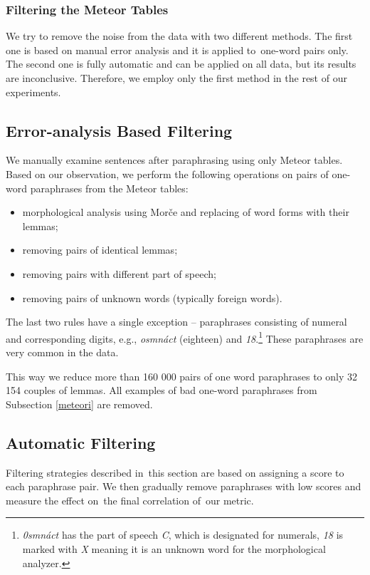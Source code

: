 \documentclass[11pt]{article}
\begin{document}
\subsubsection{Filtering the Meteor Tables}
\label{filtering-section}
We try to remove the noise from the data with two different methods. The first
one is based on manual error analysis and it is applied to~one-word pairs only.
The second one is fully automatic and can be applied on all data, but its results 
are inconclusive. Therefore, we employ only the first method in the rest of our 
experiments.

\subsection{Error-analysis Based Filtering}

We manually examine sentences after paraphrasing using only Meteor tables. Based on
our observation, we perform the following operations on pairs of one-word paraphrases 
from the Meteor tables:

\begin{itemize}
\item morphological analysis using Morče \cite{morce:2007} and replacing of word forms with their lemmas; 
\item removing pairs of identical lemmas;
\item removing pairs with different part of speech;
\item removing pairs of unknown words (typically foreign words).
\end{itemize}

The last two rules have a single exception -- paraphrases consisting of numeral and 
corresponding digits, e.g., \textit{osmnáct} (eighteen) and \textit{18}.\footnote{
\textit{0smnáct} has the part of speech \textit{C}, which is designated for numerals, 
\textit{18} is marked with \textit{X} meaning it is an unknown word for the morphological
analyzer.} These paraphrases are very common in the data. 

This way we reduce more than 160 000 pairs of one word paraphrases to only 32 154
couples of lemmas. All examples of bad one-word paraphrases from Subsection \ref{meteori} 
are removed.

\subsection{Automatic Filtering}
Filtering strategies described in~this section are based on assigning a score to
each paraphrase pair. We then gradually remove paraphrases with low scores and
measure the effect on~the final correlation of~our metric.
\end{document}
